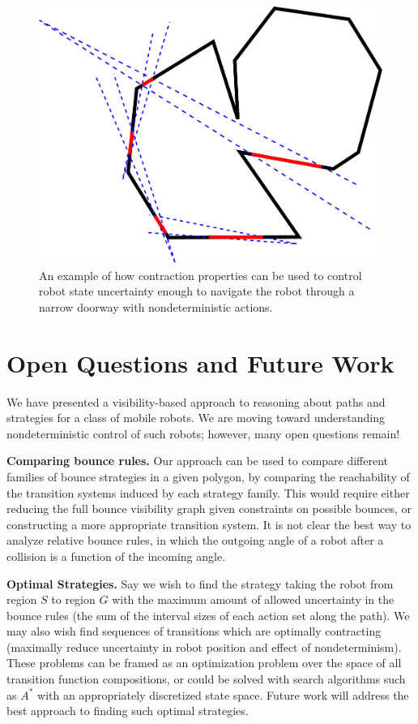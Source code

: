 \documentclass[sageh,times,Review]{sagej}
\begin{document}
\begin{figure}
    \includegraphics[width=0.8\columnwidth]{bounce_preimages.pdf}
    \centering
    \caption{An example of how contraction properties can be used to control
robot state uncertainty enough to navigate the robot through a narrow doorway
with nondeterministic actions.}
\label{fig:preimage_example}
\end{figure}


\section{Open Questions and Future Work}

We have presented a visibility-based approach to reasoning about 
paths and strategies for a class of mobile robots. We are moving toward
understanding nondeterministic control of such robots; however, many open
questions remain!

\textbf{Comparing bounce rules.} Our approach can be used to compare different families of
bounce strategies in a given polygon, by comparing the reachability of the
transition systems induced by each strategy family. This would require 
either reducing the full bounce visibility graph given constraints on
possible bounces, or constructing a more appropriate transition
system. It is not clear the best way to analyze relative bounce rules, in which the
outgoing angle of a robot after a collision is a function of the incoming angle.

\textbf{Optimal Strategies.} Say we wish to
find the strategy taking the robot from region $S$ to region $G$ with the
maximum amount of allowed uncertainty in the bounce rules (the sum of the
interval sizes of each action set along the path). We may also wish find sequences of
transitions which are optimally contracting (maximally reduce uncertainty in robot
position and effect of nondeterminism). These problems can be framed as
an optimization problem over the space of all transition function compositions,
or could be solved with search algorithms such as $A^*$ with an appropriately
discretized state space. Future work will address the best approach to finding
such optimal strategies.
\end{document}

